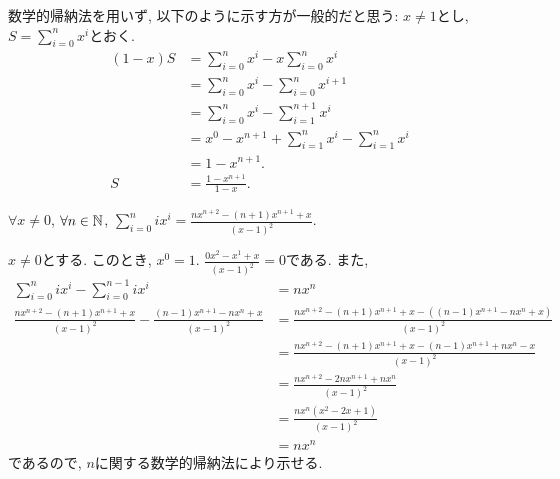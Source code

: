 \begin{rem}
  数学的帰納法を用いず, 以下のように示す方が一般的だと思う:
  $x\neq 1$とし,
  $S=\sum_{i=0}^{n}x^i$とおく.
  \begin{align*}
    (1-x)S
    &=\sum_{i=0}^{n}x^i-x\sum_{i=0}^{n}x^i\\
    &=\sum_{i=0}^{n}x^i-\sum_{i=0}^{n}x^{i+1}\\
    &=\sum_{i=0}^{n}x^i-\sum_{i=1}^{n+1}x^{i}\\
    &=x^0-x^{n+1}+\sum_{i=1}^{n}x^i-\sum_{i=1}^{n}x^{i}\\
    &=1-x^{n+1}.\\
    S&=\frac{1-x^{n+1}}{1-x}.
  \end{align*}
\end{rem}

\begin{prop}
  \label{p:20230721}
  $\forall x\neq 0$,
  $\forall n\in\mathbb{N}$,
  $\sum_{i=0}^n ix^i=\frac{nx^{n+2}-(n+1)x^{n+1}+x}{(x-1)^2}$.
\end{prop}

\begin{proof**}
  $x\neq 0$とする.
  このとき,
  $x^0=1$.
  $\frac{0x^{2}-x^{1}+x}{(x-1)^2}=0$である.
  また,
  \begin{align*}
    \sum_{i=0}^{n}ix^i-\sum_{i=0}^{n-1}ix^i&=nx^n\\
    \frac{nx^{n+2}-(n+1)x^{n+1}+x}{(x-1)^2}-\frac{(n-1)x^{n+1}-nx^{n}+x}{(x-1)^2}
    &=
    \frac{nx^{n+2}-(n+1)x^{n+1}+x-((n-1)x^{n+1}-nx^{n}+x)}{(x-1)^2}\\
    &=
    \frac{nx^{n+2}-(n+1)x^{n+1}+x-(n-1)x^{n+1}+nx^{n}-x}{(x-1)^2}\\
    &=
    \frac{nx^{n+2}-2nx^{n+1}+nx^{n}}{(x-1)^2}\\
    &=
    \frac{nx^{n}(x^2-2x+1)}{(x-1)^2}\\
    &=nx^n
  \end{align*}
  であるので,
  $n$に関する数学的帰納法により示せる.
\end{proof**}


